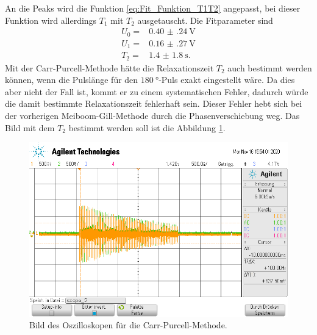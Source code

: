 An die Peaks wird die Funktion \eqref{eq:Fit_Funktion_T1T2} angepasst, bei dieser Funktion wird allerdings $T_{\text{1}}$
mit $T_{\text{2}}$ ausgetauscht.
Die Fitparameter sind
\begin{align*}
  U_{\text{0}} =& \SI{0.40(24)}{\volt}\\
  U_{\text{1}} =& \SI{0.16(27)}{\volt}\\
  T_{\text{2}} =& \SI{1.4(18)}{\second}.
\end{align*}
\FloatBarrier
Mit der Carr-Purcell-Methode hätte die Relaxationszeit $T_{\text{2}}$ auch bestimmt werden können, wenn die Pulslänge 
für den $\SI{180}{\degree}$-Puls exakt eingestellt wäre. Da dies aber nicht der Fall ist, kommt er zu einem systematischen
Fehler, dadurch würde die damit bestimmte Relaxationszeit fehlerhaft sein.
Dieser Fehler hebt sich bei der vorherigen Meiboom-Gill-Methode durch die Phasenverschiebung weg.
Das Bild mit dem $T_{\text{2}}$ bestimmt werden 
soll ist die Abbildung \ref{fig:CPM}. 
\begin{figure}
  \centering
  \includegraphics[width = \textwidth,keepaspectratio]{../Bilder/scope_2.png}
  \caption{Bild des Oszilloskopen für die Carr-Purcell-Methode.}
  \label{fig:CPM}
\end{figure}
\FloatBarrier
